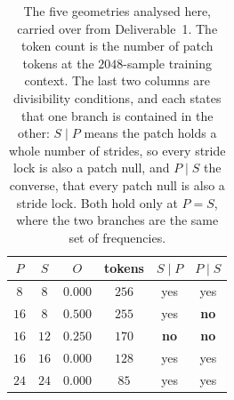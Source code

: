 \begin{table}[!b]
    \centering
    \small
    \begin{tabular}{@{}cccccc@{}}
        \toprule
        $P$ & $S$ & $O$ & \textbf{tokens} & $S \mid P$ & $P \mid S$ \\
        \midrule
        $8$ & $8$ & $0.000$ & $256$ & yes & yes \\
        \midrule
        $16$ & $8$ & $0.500$ & $255$ & yes & \textbf{no} \\
        $16$ & $12$ & $0.250$ & $170$ & \textbf{no} & \textbf{no} \\
        $16$ & $16$ & $0.000$ & $128$ & yes & yes \\
        \midrule
        $24$ & $24$ & $0.000$ & $85$ & yes & yes \\
        \bottomrule
    \end{tabular}
    \caption{The five geometries analysed here, carried over from Deliverable~1. The token count is the number of patch tokens at the $2048$-sample training context. The last two columns are divisibility conditions, and each states that one branch is contained in the other: $S \mid P$ means the patch holds a whole number of strides, so every stride lock is also a patch null, and $P \mid S$ the converse, that every patch null is also a stride lock. Both hold only at $P=S$, where the two branches are the same set of frequencies.}
    \label{tab:patchStride}
\end{table}
